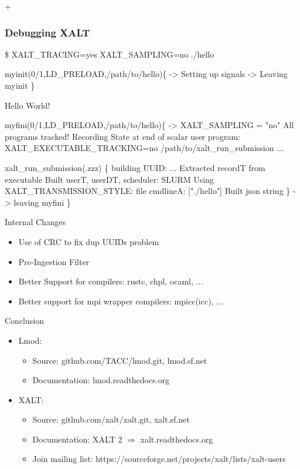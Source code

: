 +\documentclass{beamer}
\begin{document}
\begin{frame}[fragile]
    \frametitle{Debugging XALT}
 {\tiny
    \begin{semiverbatim}
\$ XALT\_TRACING=yes XALT\_SAMPLING=no ./hello

myinit(0/1,LD_PRELOAD,/path/to/hello)\{
    -> Setting up signals
    -> Leaving myinit
\}

Hello World!

myfini(0/1,LD_PRELOAD,/path/to/hello)\{
    -> XALT_SAMPLING = "no" All programs tracked!
  Recording State at end of scalar user program:
    XALT_EXECUTABLE_TRACKING=no /path/to/xalt_run_submission ...

  xalt_run_submission(.zzz) \{
    building UUID: ...
    Extracted recordT from executable
    Built userT, userDT, scheduler: SLURM
    Using XALT_TRANSMISSION_STYLE: file
    cmdlineA: ["./hello"]
    Built json string
  \}
    -> leaving myfini
\}
    \end{semiverbatim}
}
\end{frame}


\begin{frame}{Internal Changes}
  \begin{itemize}
    \item Use of CRC to fix dup UUIDs problem
    \item Pre-Ingestion Filter
    \item Better Support for compilers: rustc, chpl, ocaml, ...
    \item Better support for mpi wrapper compilers: mpicc(icc), ...
  \end{itemize}
\end{frame}


\begin{frame}{Conclusion}
  \begin{itemize}
    \item Lmod:
      \begin{itemize}
        \item Source: github.com/TACC/lmod.git, lmod.sf.net
        \item Documentation: lmod.readthedocs.org
      \end{itemize}
    \item XALT:
      \begin{itemize}
        \item Source: github.com/xalt/xalt.git, xalt.sf.net
        \item Documentation: XALT 2 $\Rightarrow$ xalt.readthedocs.org
        \item Join mailing list: https://sourceforge.net/projects/xalt/lists/xalt-users
      \end{itemize}
  \end{itemize}
\end{frame}

%
\end{document}
